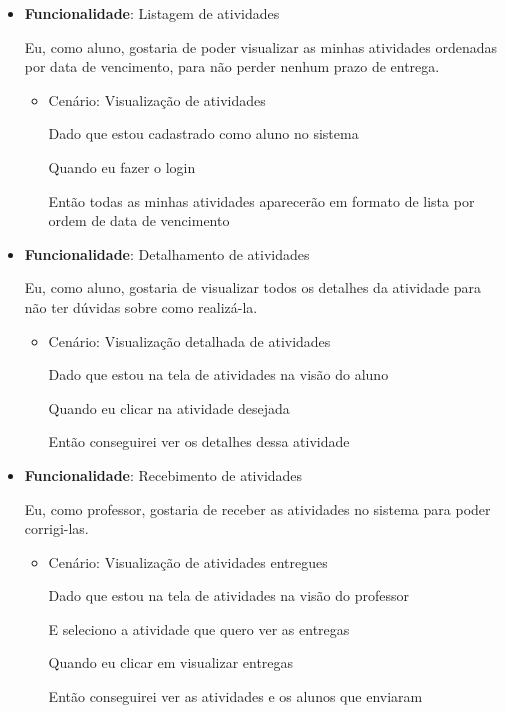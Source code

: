 \begin{itemize}
\item\textbf{Funcionalidade}: Listagem de atividades
    
    Eu, como aluno, gostaria de poder visualizar as minhas atividades ordenadas por data de vencimento, para não perder nenhum prazo de entrega.
    \begin{itemize}
        \item Cenário: Visualização de atividades 
        \par Dado que estou cadastrado como aluno no sistema
        \par Quando eu fazer o login
        \par Então todas as minhas atividades aparecerão em formato de lista por ordem de data de vencimento
    \end{itemize}   

\item\textbf{Funcionalidade}: Detalhamento de atividades
    
    Eu, como aluno, gostaria de visualizar todos os detalhes da atividade para não ter dúvidas sobre como realizá-la.
    \begin{itemize}
        \item Cenário: Visualização detalhada de atividades  
        \par Dado que estou na tela de atividades na visão do aluno
        \par Quando eu clicar na atividade desejada
        \par Então conseguirei ver os detalhes dessa atividade
    \end{itemize}  

\item\textbf{Funcionalidade}: Recebimento de atividades
    
    Eu, como professor, gostaria de receber as atividades no sistema para poder corrigi-las.
    \begin{itemize}
        \item Cenário: Visualização de atividades entregues
        \par Dado que estou na tela de atividades na visão do professor
        \par E seleciono a atividade que quero ver as entregas
        \par Quando eu clicar em visualizar entregas
        \par Então conseguirei ver as atividades e os alunos que enviaram
    \end{itemize}


\end{itemize}
